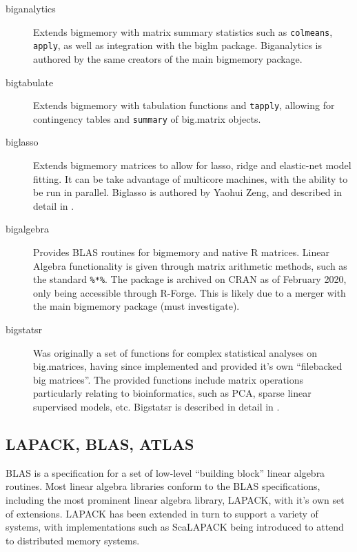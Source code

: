 \documentclass[10pt,a4paper]{article}
\begin{document}
\begin{description}
	\item[biganalytics] Extends bigmemory with matrix summary statistics
	      such as \texttt{colmeans}, \texttt{apply}, as well as integration
	      with the biglm package\cite{emerson16}. Biganalytics is authored by
	      the same creators of the main bigmemory package.
	\item[bigtabulate] Extends bigmemory with tabulation functions and
	      \texttt{tapply}, allowing for contingency tables and
	      \texttt{summary} of big.matrix objects\parencite{kane16}.
	\item[biglasso] Extends bigmemory matrices to allow for lasso, ridge
	      and elastic-net model fitting. It can be take advantage of multicore
	      machines, with the ability to be run in parallel. Biglasso is
	      authored by Yaohui Zeng, and described in detail in
	      \textcite{zeng2017biglasso}.
	\item[bigalgebra] Provides BLAS routines for bigmemory and native R
	      matrices. Linear Algebra functionality is given through matrix
	      arithmetic methods, such as the standard \texttt{\%*\%}. The package
	      is archived on CRAN as of February 2020, only being accessible
	      through R-Forge. This is likely due to a merger with the main
	      bigmemory package (must investigate).
	\item[bigstatsr] Was originally a set of functions for complex
	      statistical analyses on big.matrices, having since implemented and
	      provided it's own ``filebacked big matrices''\cite{prive2018efficient}. The provided
	      functions include matrix operations particularly relating to
	      bioinformatics, such as PCA, sparse linear supervised models, etc.
	      Bigstatsr is described in detail in \textcite{prive2018efficient}.
\end{description}

\subsection{LAPACK, BLAS, ATLAS}
\label{sec:blas-lapack}

BLAS is a specification for a set of low-level ``building block''
linear algebra routines\cite{lawson1979basic}. Most linear algebra
libraries conform to the BLAS specifications, including the most
prominent linear algebra library, LAPACK, with it's own set of
extensions\cite{demmel1989lapack}. LAPACK has been extended in turn to
support a variety of systems, with implementations such as ScaLAPACK
being introduced to attend to distributed memory
systems\cite{choi1992scalapack}.
\end{document}
